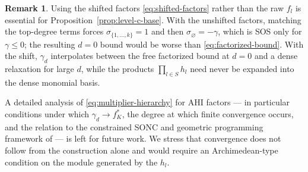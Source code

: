 \documentclass[12pt]{elsarticle}
\theoremstyle{definition}
\newtheorem{example}[theorem]{Example}
\newtheorem{remark}[theorem]{Remark}
\begin{document}
\begin{remark}\label{rem:shift-needed}
Using the shifted factors \eqref{eq:shifted-factors} rather than the raw $f_l$ is essential for Proposition~\ref{prop:level-c-base}. With the unshifted factors, matching the top-degree terms forces $\sigma_{\{1,\dots,k\}}=1$ and then $\sigma_{\varnothing} = -\gamma$, which is SOS only for $\gamma\le 0$; the resulting $d=0$ bound would be worse than \eqref{eq:factorized-bound}. With the shift, $\gamma_d$ interpolates between the free factorized bound at $d=0$ and a dense relaxation for large $d$, while the products $\prod_{l \in S} h_l$ need never be expanded into the dense monomial basis.
\end{remark}


A detailed analysis of \eqref{eq:multiplier-hierarchy} for AHI factors --- in particular conditions under which $\gamma_d \to f^{*}_K$, the degree at which finite convergence occurs, and the relation to the constrained SONC and geometric programming framework of \citet{dressler2019approach} --- is left for future work. We stress that convergence does not follow from the construction alone and would require an Archimedean-type condition on the module generated by the $h_l$.
\end{document}
